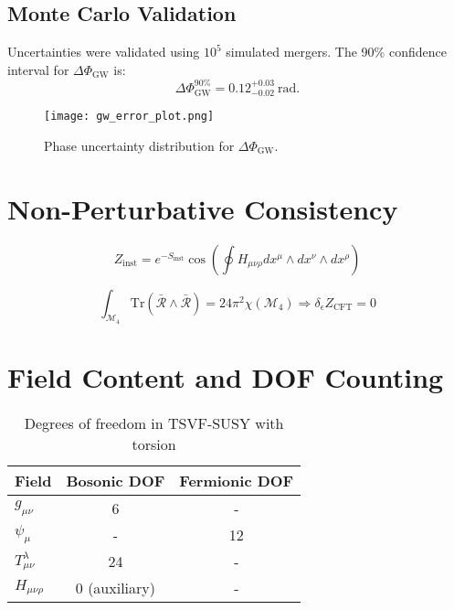 \documentclass[12pt, onecolumn]{article}
\theoremstyle{definition}
\numberwithin{equation}{section}
\begin{document}
\begin{appendices}
\subsection{Monte Carlo Validation}
Uncertainties were validated using \(10^5\) simulated mergers. The 90\% confidence interval for \(\Delta\Phi_{\text{GW}}\) is:
\begin{equation}
  \Delta\Phi_{\text{GW}}^{\text{90\%}} = 0.12^{+0.03}_{-0.02}~\text{rad}.
\end{equation}

\begin{figure}[ht]
  \centering
  \texttt{[image: gw\_error\_plot.png]}
  \caption{Phase uncertainty distribution for \(\Delta\Phi_{\text{GW}}\).}
  \label{fig:gw_error}
\end{figure}

\section{Non-Perturbative Consistency}  
\label{app:nonperturb}  

\begin{equation}  
Z_{\text{inst}} = e^{-S_{\text{inst}}}\cos\left(\oint H_{\mu\nu\rho} dx^\mu \wedge dx^\nu \wedge dx^\rho\right)
\end{equation}

\begin{equation}  
\int_{\mathcal{M}_4} \mathrm{Tr}(\bar{\mathcal{R}} \wedge \bar{\mathcal{R}}) = 24\pi^2\chi(\mathcal{M}_4) \Rightarrow \delta_\epsilon Z_{\text{CFT}} = 0
\end{equation}

\section{Field Content and DOF Counting}  
\label{app:dof}  

\begin{table}[htbp]
\centering
\caption{Degrees of freedom in TSVF-SUSY with torsion}
\begin{tabular}{lcc}
\toprule
Field & Bosonic DOF & Fermionic DOF \\
\midrule
$g_{\mu\nu}$ & 6 & - \\
$\psi_\mu$ & - & 12 \\
$T^\lambda_{\mu\nu}$ & 24 & - \\
$H_{\mu\nu\rho}$ & 0 (auxiliary) & - \\
\bottomrule
\end{tabular}
\end{table}


\end{appendices}
\end{document}
